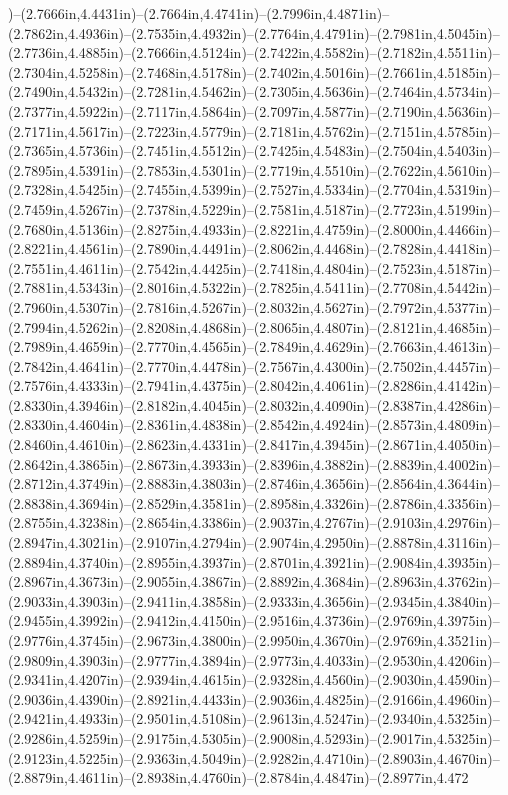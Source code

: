 )--(2.7666in,4.4431in)--(2.7664in,4.4741in)--(2.7996in,4.4871in)--(2.7862in,4.4936in)--(2.7535in,4.4932in)--(2.7764in,4.4791in)--(2.7981in,4.5045in)--(2.7736in,4.4885in)--(2.7666in,4.5124in)--(2.7422in,4.5582in)--(2.7182in,4.5511in)--(2.7304in,4.5258in)--(2.7468in,4.5178in)--(2.7402in,4.5016in)--(2.7661in,4.5185in)--(2.7490in,4.5432in)--(2.7281in,4.5462in)--(2.7305in,4.5636in)--(2.7464in,4.5734in)--(2.7377in,4.5922in)--(2.7117in,4.5864in)--(2.7097in,4.5877in)--(2.7190in,4.5636in)--(2.7171in,4.5617in)--(2.7223in,4.5779in)--(2.7181in,4.5762in)--(2.7151in,4.5785in)--(2.7365in,4.5736in)--(2.7451in,4.5512in)--(2.7425in,4.5483in)--(2.7504in,4.5403in)--(2.7895in,4.5391in)--(2.7853in,4.5301in)--(2.7719in,4.5510in)--(2.7622in,4.5610in)--(2.7328in,4.5425in)--(2.7455in,4.5399in)--(2.7527in,4.5334in)--(2.7704in,4.5319in)--(2.7459in,4.5267in)--(2.7378in,4.5229in)--(2.7581in,4.5187in)--(2.7723in,4.5199in)--(2.7680in,4.5136in)--(2.8275in,4.4933in)--(2.8221in,4.4759in)--(2.8000in,4.4466in)--(2.8221in,4.4561in)--(2.7890in,4.4491in)--(2.8062in,4.4468in)--(2.7828in,4.4418in)--(2.7551in,4.4611in)--(2.7542in,4.4425in)--(2.7418in,4.4804in)--(2.7523in,4.5187in)--(2.7881in,4.5343in)--(2.8016in,4.5322in)--(2.7825in,4.5411in)--(2.7708in,4.5442in)--(2.7960in,4.5307in)--(2.7816in,4.5267in)--(2.8032in,4.5627in)--(2.7972in,4.5377in)--(2.7994in,4.5262in)--(2.8208in,4.4868in)--(2.8065in,4.4807in)--(2.8121in,4.4685in)--(2.7989in,4.4659in)--(2.7770in,4.4565in)--(2.7849in,4.4629in)--(2.7663in,4.4613in)--(2.7842in,4.4641in)--(2.7770in,4.4478in)--(2.7567in,4.4300in)--(2.7502in,4.4457in)--(2.7576in,4.4333in)--(2.7941in,4.4375in)--(2.8042in,4.4061in)--(2.8286in,4.4142in)--(2.8330in,4.3946in)--(2.8182in,4.4045in)--(2.8032in,4.4090in)--(2.8387in,4.4286in)--(2.8330in,4.4604in)--(2.8361in,4.4838in)--(2.8542in,4.4924in)--(2.8573in,4.4809in)--(2.8460in,4.4610in)--(2.8623in,4.4331in)--(2.8417in,4.3945in)--(2.8671in,4.4050in)--(2.8642in,4.3865in)--(2.8673in,4.3933in)--(2.8396in,4.3882in)--(2.8839in,4.4002in)--(2.8712in,4.3749in)--(2.8883in,4.3803in)--(2.8746in,4.3656in)--(2.8564in,4.3644in)--(2.8838in,4.3694in)--(2.8529in,4.3581in)--(2.8958in,4.3326in)--(2.8786in,4.3356in)--(2.8755in,4.3238in)--(2.8654in,4.3386in)--(2.9037in,4.2767in)--(2.9103in,4.2976in)--(2.8947in,4.3021in)--(2.9107in,4.2794in)--(2.9074in,4.2950in)--(2.8878in,4.3116in)--(2.8894in,4.3740in)--(2.8955in,4.3937in)--(2.8701in,4.3921in)--(2.9084in,4.3935in)--(2.8967in,4.3673in)--(2.9055in,4.3867in)--(2.8892in,4.3684in)--(2.8963in,4.3762in)--(2.9033in,4.3903in)--(2.9411in,4.3858in)--(2.9333in,4.3656in)--(2.9345in,4.3840in)--(2.9455in,4.3992in)--(2.9412in,4.4150in)--(2.9516in,4.3736in)--(2.9769in,4.3975in)--(2.9776in,4.3745in)--(2.9673in,4.3800in)--(2.9950in,4.3670in)--(2.9769in,4.3521in)--(2.9809in,4.3903in)--(2.9777in,4.3894in)--(2.9773in,4.4033in)--(2.9530in,4.4206in)--(2.9341in,4.4207in)--(2.9394in,4.4615in)--(2.9328in,4.4560in)--(2.9030in,4.4590in)--(2.9036in,4.4390in)--(2.8921in,4.4433in)--(2.9036in,4.4825in)--(2.9166in,4.4960in)--(2.9421in,4.4933in)--(2.9501in,4.5108in)--(2.9613in,4.5247in)--(2.9340in,4.5325in)--(2.9286in,4.5259in)--(2.9175in,4.5305in)--(2.9008in,4.5293in)--(2.9017in,4.5325in)--(2.9123in,4.5225in)--(2.9363in,4.5049in)--(2.9282in,4.4710in)--(2.8903in,4.4670in)--(2.8879in,4.4611in)--(2.8938in,4.4760in)--(2.8784in,4.4847in)--(2.8977in,4.472
